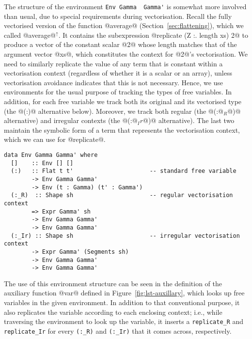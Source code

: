 The structure of the environment \lstinline[style=ndp]{Env Gamma  Gamma'} is somewhat more involved than usual, due to special requirements during vectorisation. Recall the fully vectorised version of the function @average@ (Section~\ref{sec:flattening}), which we called @average@$^\uparrow$. It contains the subexpression @replicate (Z :. length xs) 2@ to produce a vector of the constant scalar @2@ whose length matches that of the argument vector @xs@, which constitutes the context for @2@'s vectorisation. We need to similarly replicate the value of any term that is constant within a vectorisation context (regardless of whether it is a scalar or an array), unless vectorisation avoidance indicates that this is not necessary. Hence, we use environments for the usual purpose of tracking the types of free variables. In addition, for each free variable we track both its original and its vectorised type (the @(:)@ alternative below). Moreover, we track both regular (the @(:@$_R$@)@ alternative) and irregular contexts (the @(:@$_Ir$@)@ alternative). The last two maintain the symbolic form of a term that represents the vectorisation context, which we can use for @replicate@.
%
\begin{lstlisting}[style=ndp]
data Env Gamma Gamma' where
  []    :: Env [] []
  (:)   :: Flat t t'                      -- standard free variable
        -> Env Gamma Gamma'
        -> Env (t : Gamma) (t' : Gamma')
  (:_R)  :: Shape sh                      -- regular vectorisation context
        => Expr Gamma' sh
        -> Env Gamma Gamma'
        -> Env Gamma Gamma'
  (:_Ir) :: Shape sh                      -- irregular vectorisation context
        -> Expr Gamma' (Segments sh)
        -> Env Gamma Gamma'
        -> Env Gamma Gamma'
\end{lstlisting}
%
The use of this environment structure can be seen in the definition of the auxiliary function @var@ defined in Figure~\ref{fig:lst-auxillary}, which looks up free variables in the given environment. In addition to that conventional purpose, it also replicates the variable according to each enclosing context; i.e., while traversing the environment to look up the variable, it inserts a \lstinline[style=ndp]{replicate_R} and \lstinline[style=ndp]{replicate_Ir} for every \lstinline[style=ndp]{(:_R)} and \lstinline[style=ndp]{(:_Ir)} that it comes across, respectively.
%
